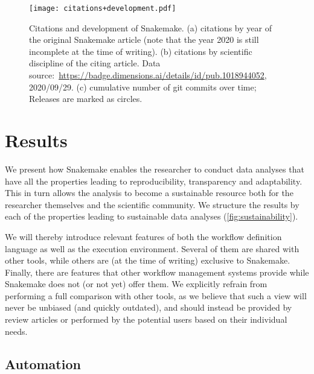 \documentclass[parskip=half, DIV=18]{scrartcl}
\let\plainurl\url
\renewcommand{\url}[1]{\protect\plainurl{#1}}
\begin{document}
\begin{figure}
    \centering
	\texttt{[image: citations+development.pdf]}
	\caption{
		Citations and development of Snakemake.
		(a) citations by year of the original Snakemake article (note that the year 2020 is still incomplete at the time of writing).
		(b) citations by scientific discipline of the citing article.
		Data source:~\url{https://badge.dimensions.ai/details/id/pub.1018944052}, 2020/09/29.
		(c) cumulative number of git commits over time; Releases are marked as circles.
	}
	\label{fig:citations}
\end{figure}

\section{Results}

We present how Snakemake enables the researcher to conduct data analyses that have all the properties leading to reproducibility, transparency and adaptability. This in turn allows the analysis to become a sustainable resource both for the researcher themselves and the scientific community. 
We structure the results by each of the properties leading to sustainable data analyses (\autoref{fig:sustainability}).

We will thereby introduce relevant features of both the workflow definition language as well as the execution environment.
Several of them are shared with other tools, while others are (at the time of writing) exclusive to Snakemake.
Finally, there are features that other workflow management systems provide while Snakemake does not (or not yet) offer them.
We explicitly refrain from performing a full comparison with other tools, as we believe that such a view will never be unbiased (and quickly outdated), and should instead be provided by review articles or performed by the potential users based on their individual needs.

\subsection{Automation}\label{sec:automation}
\end{document}
